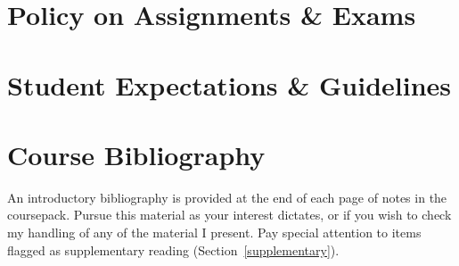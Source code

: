 \documentclass[titlepage]{article}
\newcommand\policy{../policy}
\begin{document}


\section{Policy on Assignments \& Exams}
\label{policy}





\section{Student Expectations \& Guidelines}
\label{expectations}







\section{Course Bibliography}
\label{bibliography}

An introductory bibliography is provided at the end of each page of
notes in the coursepack. Pursue this material as your interest dictates,
or if you wish to check my handling of any of the material I present.
Pay special attention to items flagged as supplementary reading
(Section~\ref{supplementary}).
\end{document}
